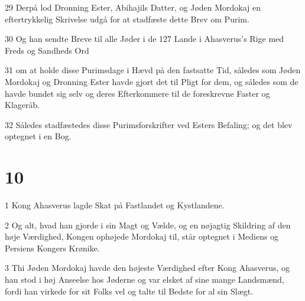 \par 29 Derpå lod Dronning Ester, Abihajils Datter, og Jøden Mordokaj en eftertrykkelig Skrivelse udgå for at stadfæste dette Brev om Purim.
\par 30 Og han sendte Breve til alle Jøder i de 127 Lande i Ahasverus's Rige med Freds og Sandheds Ord
\par 31 om at holde disse Purimsdage i Hævd på den fastsatte Tid, således som Jøden Mordokaj og Dronning Ester havde gjort det til Pligt for dem, og således som de havde bundet sig selv og deres Efterkommere til de foreskrevne Faster og Klageråb.
\par 32 Således stadfæstedes disse Purimsforskrifter ved Esters Befaling; og det blev optegnet i en Bog.

\chapter{10}

\par 1 Kong Ahasverus lagde Skat på Fastlandet og Kystlandene.
\par 2 Og alt, hvad han gjorde i sin Magt og Vælde, og en nøjagtig Skildring af den høje Værdighed, Kongen ophøjede Mordokaj til, står optegnet i Mediens og Persiens Kongers Krønike.
\par 3 Thi Jøden Mordokaj havde den højeste Værdighed efter Kong Ahasverus, og han stod i høj Anseelse hos Jøderne og var elsket af sine mange Landsmænd, fordi han virkede for sit Folks vel og talte til Bedste for al sin Slægt.


